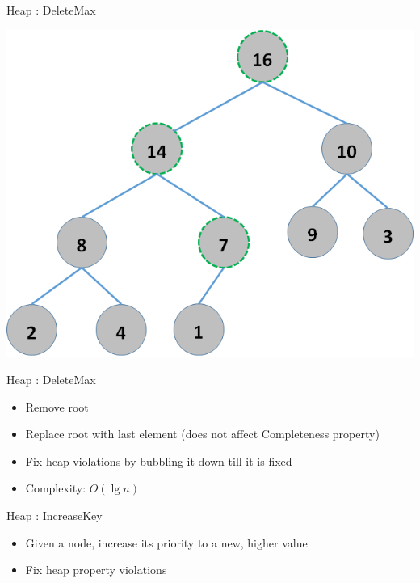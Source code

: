 \documentclass{beamer}
\begin{document}
\begin{frame}{Heap : DeleteMax}
    \begin{center}
        \includegraphics[scale=0.5]{heapDelete6.png}
    \end{center}
\end{frame}


\begin{frame}{Heap : DeleteMax}
    \begin{itemize}
        \item Remove root
        \item Replace root with last element (does not affect Completeness property)
        \item Fix heap violations by bubbling it down till it is fixed
        \item Complexity: \pause $O(\lg n)$
    \end{itemize}
\end{frame}


\begin{frame}{Heap : IncreaseKey}
    \begin{itemize}
        \item Given a node, increase its priority to a new, higher value
        \item Fix heap property violations 
    \end{itemize}
\end{frame}
\end{document}
